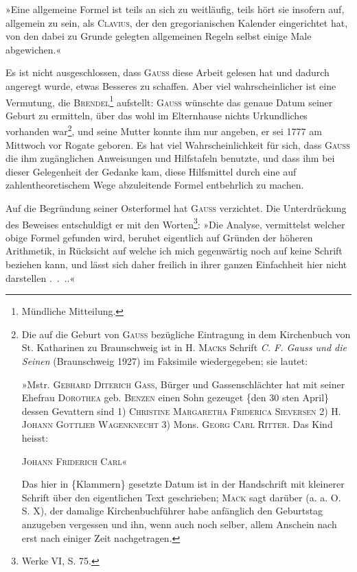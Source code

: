 »Eine allgemeine Formel ist teils an sich zu weitläufig, teils hört sie insofern auf, allgemein zu sein, als \textsc{Clavius}, der den gregorianischen Kalender
eingerichtet hat, von den dabei zu Grunde gelegten allgemeinen Regeln selbst
einige Male abgewichen.«

Es ist nicht ausgeschlossen, dass \textsc{Gauss} diese Arbeit gelesen hat und dadurch angeregt wurde, etwas Besseres zu schaffen. Aber viel wahrscheinlicher ist eine Vermutung, die \textsc{Brendel}\footnote{Mündliche Mitteilung.} aufstellt: \textsc{Gauss} wünschte das genaue
\clearpage{}
\setcounter{footnote}{0}
\noindent Datum seiner Geburt zu ermitteln, über das wohl im Elternhause nichts Urkundliches vorhanden war\footnote{Die auf die Geburt von \textsc{Gauss} bezügliche Eintragung in dem Kirchenbuch von St. Katharinen
zu Braunschweig ist in H. \textsc{Macks} Schrift \textit{C. F. Gauss und die Seinen} (Braunschweig 1927) im Faksimile
wiedergegeben; sie lautet:
\par\noindent\hspace*{\parindent}»Mstr. \textsc{Gebhard Diterich Gass}, Bürger und Gassenschlächter hat mit seiner Ehefrau \textsc{Dorothea} geb. \textsc{Benzen} einen Sohn gezeuget \{den 30 sten April\} dessen Gevattern sind 1) \textsc{Christine
Margaretha Friderica Sieversen} 2) H. \textsc{Johann Gottlieb Wagenknecht} 3) Mons. \textsc{Georg
Carl Ritter}. Das Kind heisst:
\par\centerline{\textsc{Johann Friderich Carl}«}
\par\noindent\hspace*{\parindent}Das hier in \{Klammern\} gesetzte Datum ist in der Handschrift mit kleinerer Schrift über den eigentlichen Text geschrieben; \textsc{Mack} sagt darüber (a. a. O. S. X), der damalige Kirchenbuchführer habe anfänglich den Geburtstag anzugeben vergessen und ihn, wenn auch noch selber, allem Anschein nach erst nach
einiger Zeit nachgetragen.}, und seine Mutter konnte ihm nur angeben, er
sei 1777 am Mittwoch vor Rogate geboren. Es hat viel Wahrscheinlichkeit
für sich, dass \textsc{Gauss} die ihm zugänglichen Anweisungen und Hilfstafeln benutzte, und dass ihm bei dieser Gelegenheit der Gedanke kam, diese Hilfsmittel durch eine auf zahlentheoretischem Wege abzuleitende Formel entbehrlich zu machen.

Auf die Begründung seiner Osterformel hat \textsc{Gauss} verzichtet. Die Unterdrückung des Beweises entschuldigt er mit den Worten\footnote{Werke VI, S. 75.}: »Die Analyse, vermittelst welcher obige Formel gefunden wird, beruhet eigentlich auf Gründen
der höheren Arithmetik, in Rücksicht auf welche ich mich gegenwärtig noch
auf keine Schrift beziehen kann, und lässt sich daher freilich in ihrer ganzen
Einfachheit hier nicht darstellen .\ .\ ..«

